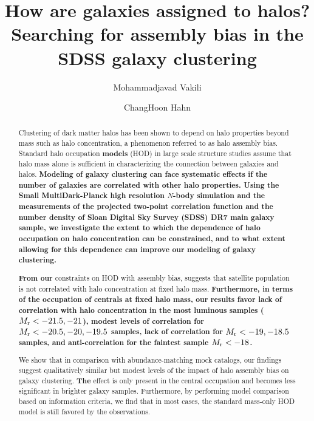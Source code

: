 \documentclass[twocolumn]{aastex61}
\begin{document}
\title{How are galaxies assigned to halos? \\ Searching for assembly bias in the SDSS galaxy clustering}

\author{Mohammadjavad Vakili}

\author{ChangHoon Hahn}

\begin{abstract}
Clustering of dark matter halos has been shown to depend on halo properties beyond mass such as halo concentration, a phenomenon referred to as halo assembly bias. 
Standard halo occupation {\bf \color{dred} models} (HOD) in large scale structure studies assume that halo mass alone is sufficient in characterizing the connection between galaxies and halos. 
{\bf \color{darkgreen}
Modeling of galaxy clustering can face systematic effects if the number of galaxies are correlated with other halo properties. Using the Small MultiDark-Planck high resolution $N$-body simulation and the measurements of the projected two-point correlation function and the number density of Sloan Digital Sky Survey (SDSS) DR7 main galaxy sample, we investigate the extent to which the dependence of halo occupation on halo concentration can be constrained, and to what extent allowing for this dependence can improve our modeling of galaxy clustering.  
}

{\bf \color{dred} From our} constraints on HOD with assembly bias, suggests that satellite population is not correlated with halo concentration at fixed halo mass. 
{\bf \color{darkgreen} 
Furthermore, in terms of the occupation of centrals at fixed halo mass, our results favor lack of correlation with halo concentration in the most luminous samples ($M_{\rm r}<-21.5,-21$), modest levels of correlation for $M_{\rm r}<-20.5,-20, -19.5$ samples, lack of correlation for $M_{\rm r}<-19,-18.5$ samples, and anti-correlation for the faintest sample $M_{\rm r}<-18$.} 

We show that in comparison with abundance-matching mock catalogs, our findings suggest qualitatively similar but modest levels of the impact of halo assembly bias on galaxy clustering. 
{\bf \color{dred} The} effect is only present in the central occupation and becomes less significant in brighter galaxy samples.
Furthermore, by performing model comparison based on information criteria, we find that in most cases, the standard mass-only HOD model is still favored by the observations.

\end{abstract}
\end{document}
